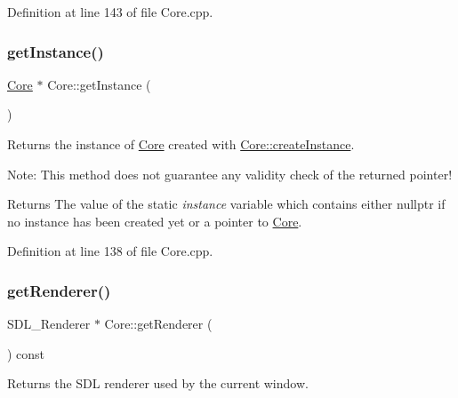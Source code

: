 Definition at line 143 of file Core.\+cpp.

\mbox{\label{classbkengine_1_1Core_a6d89a3e61f9a485ce2ff6586c340e94b}} 
\subsubsection{\texorpdfstring{get\+Instance()}{getInstance()}}
{\footnotesize\ttfamily \hyperlink{classbkengine_1_1Core}{Core} $\ast$ Core\+::get\+Instance (\begin{DoxyParamCaption}{ }\end{DoxyParamCaption})\hspace{0.3cm}{\ttfamily [static]}}



Returns the instance of \hyperlink{classbkengine_1_1Core}{Core} created with \hyperlink{classbkengine_1_1Core_a8b809ebbd1348ae9b59d49388e7a18f0}{Core\+::create\+Instance}. 

Note\+: This method does not guarantee any validity check of the returned pointer!

\begin{DoxyReturn}{Returns}
The value of the static {\itshape instance} variable which contains either {\ttfamily nullptr} if no instance has been created yet or a pointer to \hyperlink{classbkengine_1_1Core}{Core}. 
\end{DoxyReturn}


Definition at line 138 of file Core.\+cpp.

\mbox{\label{classbkengine_1_1Core_ae60422517185c5e03e754765af0806bb}} 
\subsubsection{\texorpdfstring{get\+Renderer()}{getRenderer()}}
{\footnotesize\ttfamily S\+D\+L\+\_\+\+Renderer $\ast$ Core\+::get\+Renderer (\begin{DoxyParamCaption}{ }\end{DoxyParamCaption}) const}



Returns the S\+DL renderer used by the current window. 

